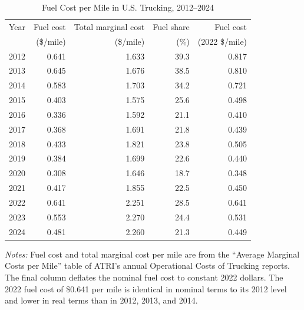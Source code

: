 \begin{table}[htbp]
\centering
\caption{Fuel Cost per Mile in U.S. Trucking, 2012--2024}
\label{tab:atri_fuel_series}
\begin{threeparttable}
\begin{tabular}{l>{\hspace{1.5em}}r>{\hspace{1.5em}}r>{\hspace{1.5em}}r>{\hspace{1.5em}}r}
\hline\hline
Year & Fuel cost & Total marginal cost & Fuel share & Fuel cost \\
     & (\$/mile)  & (\$/mile)           & (\%)        & (2022 \$/mile) \\
\hline
2012 & 0.641 & 1.633 & 39.3 & 0.817 \\
2013 & 0.645 & 1.676 & 38.5 & 0.810 \\
2014 & 0.583 & 1.703 & 34.2 & 0.721 \\
2015 & 0.403 & 1.575 & 25.6 & 0.498 \\
2016 & 0.336 & 1.592 & 21.1 & 0.410 \\
2017 & 0.368 & 1.691 & 21.8 & 0.439 \\
2018 & 0.433 & 1.821 & 23.8 & 0.505 \\
2019 & 0.384 & 1.699 & 22.6 & 0.440 \\
2020 & 0.308 & 1.646 & 18.7 & 0.348 \\
2021 & 0.417 & 1.855 & 22.5 & 0.450 \\
2022 & 0.641 & 2.251 & 28.5 & 0.641 \\
2023 & 0.553 & 2.270 & 24.4 & 0.531 \\
2024 & 0.481 & 2.260 & 21.3 & 0.449 \\
\hline\hline
\end{tabular}
\begin{tablenotes}
    \small
    \item \textit{Notes:} Fuel cost and total marginal cost per mile are from the ``Average Marginal Costs per Mile'' table of ATRI's annual Operational Costs of Trucking reports. The final column deflates the nominal fuel cost to constant 2022 dollars. The 2022 fuel cost of \$0.641 per mile is identical in nominal terms to its 2012 level and lower in real terms than in 2012, 2013, and 2014.
 \end{tablenotes}
\end{threeparttable}
\end{table}
